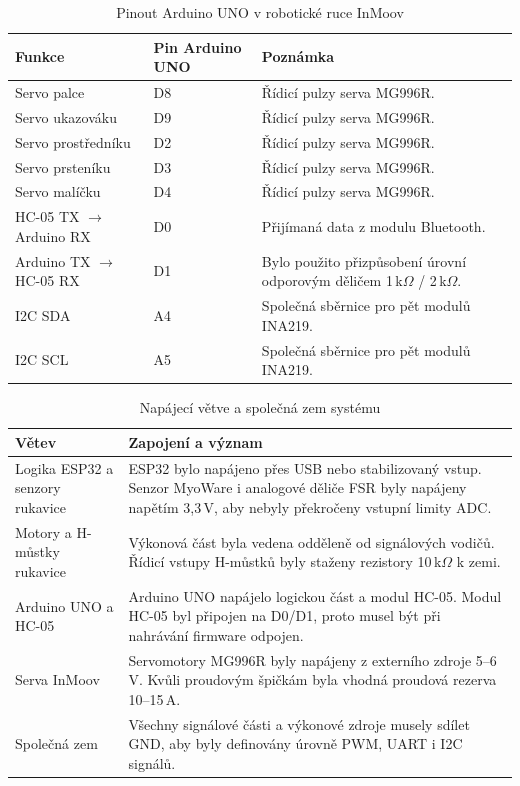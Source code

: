 \begin{table}[htbp]
\centering
\caption{Pinout Arduino UNO v robotické ruce InMoov}
\label{tab:pinout-arduino}
\begin{tabular}{|p{}|p{}|p{}|}
\hline
\textbf{Funkce} & \textbf{Pin Arduino UNO} & \textbf{Poznámka} \\
\hline
Servo palce & D8 & Řídicí pulzy serva MG996R. \\
\hline
Servo ukazováku & D9 & Řídicí pulzy serva MG996R. \\
\hline
Servo prostředníku & D2 & Řídicí pulzy serva MG996R. \\
\hline
Servo prsteníku & D3 & Řídicí pulzy serva MG996R. \\
\hline
Servo malíčku & D4 & Řídicí pulzy serva MG996R. \\
\hline
HC-05 TX $\rightarrow$ Arduino RX & D0 & Přijímaná data z modulu Bluetooth. \\
\hline
Arduino TX $\rightarrow$ HC-05 RX & D1 & Bylo použito přizpůsobení úrovní odporovým děličem 1\,k$\Omega$ / 2\,k$\Omega$. \\
\hline
I2C SDA & A4 & Společná sběrnice pro pět modulů INA219. \\
\hline
I2C SCL & A5 & Společná sběrnice pro pět modulů INA219. \\
\hline
\end{tabular}
\end{table}

\begin{table}[htbp]
\centering
\caption{Napájecí větve a společná zem systému}
\label{tab:napajeci-vetve}
\begin{tabular}{|p{}|p{}|}
\hline
\textbf{Větev} & \textbf{Zapojení a význam} \\
\hline
Logika ESP32 a senzory rukavice & ESP32 bylo napájeno přes USB nebo stabilizovaný vstup. Senzor MyoWare i analogové děliče FSR byly napájeny napětím 3,3\,V, aby nebyly překročeny vstupní limity ADC. \\
\hline
Motory a H-můstky rukavice & Výkonová část byla vedena odděleně od signálových vodičů. Řídicí vstupy H-můstků byly staženy rezistory 10\,k$\Omega$ k zemi. \\
\hline
Arduino UNO a HC-05 & Arduino UNO napájelo logickou část a modul HC-05. Modul HC-05 byl připojen na D0/D1, proto musel být při nahrávání firmware odpojen. \\
\hline
Serva InMoov & Servomotory MG996R byly napájeny z externího zdroje 5--6\,V. Kvůli proudovým špičkám byla vhodná proudová rezerva 10--15\,A. \\
\hline
Společná zem & Všechny signálové části a výkonové zdroje musely sdílet GND, aby byly definovány úrovně PWM, UART i I2C signálů. \\
\hline
\end{tabular}
\end{table}

